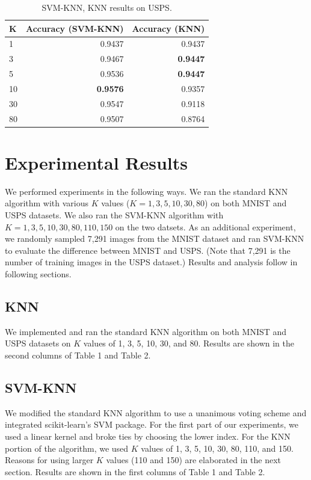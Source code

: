 \documentclass[11pt,letterpaper]{article}
\begin{document}
\begin{table}
\begin{center}
\begin{tabular}{|l|r|r|}
\hline \bf K & \bf Accuracy (SVM-KNN) & \bf Accuracy (KNN)\\ \hline
1 & 0.9437 & 0.9437\\
3 & 0.9467 & \textbf{0.9447}\\
5 & 0.9536 & \textbf{0.9447}\\
10 & \textbf{0.9576} & 0.9357\\
30 & 0.9547 & 0.9118\\
80 & 0.9507 & 0.8764\\
\hline
\end{tabular}
\end{center}
\caption{\label{knn-mnist} SVM-KNN, KNN results on USPS. }
\end{table}

\section{Experimental Results}

We performed experiments in the following ways. We ran the standard KNN algorithm with various $K$ values ($K=1,3,5,10,30,80$) on both MNIST and USPS datasets. We also ran the SVM-KNN algorithm with $K=1,3,5,10,30,80,110,150$ on the two datsets. As an additional experiment, we randomly sampled 7,291 images from the MNIST dataset and ran SVM-KNN to evaluate the difference between MNIST and USPS. (Note that 7,291 is the number of training images in the USPS dataset.) Results and analysis follow in following sections.

\subsection{KNN}

We implemented and ran the standard KNN algorithm on both MNIST and USPS datasets on $K$ values of 1, 3, 5, 10, 30, and 80. Results are shown in the second columns of Table 1 and Table 2.

\subsection{SVM-KNN}

We modified the standard KNN algorithm to use a unanimous voting scheme and integrated scikit-learn's SVM package. For the first part of our experiments, we used a linear kernel and broke ties by choosing the lower index. For the KNN portion of the algorithm, we used $K$ values of 1, 3, 5, 10, 30, 80, 110, and 150. Reasons for using larger $K$ values (110 and 150) are elaborated in the next section. Results are shown in the first columns of Table 1 and Table 2.
\end{document}
